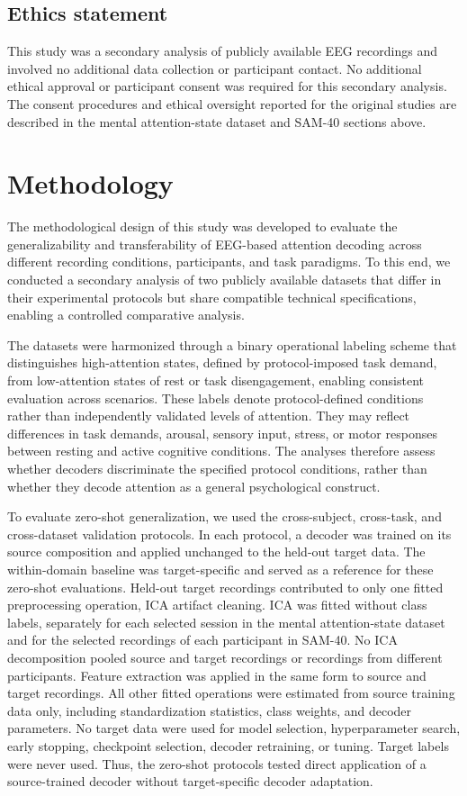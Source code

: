\documentclass[10pt,letterpaper]{article}
\newcommand{\rev}[1]{#1}
\begin{document}
\subsection*{Ethics statement}

This study was a secondary analysis of publicly available EEG recordings and involved no additional data collection or participant contact. No additional ethical approval or participant consent was required for this secondary analysis. The consent procedures and ethical oversight reported for the original studies are described in the mental attention-state dataset and SAM-40 sections above.

\section*{Methodology}

The methodological design of this study was developed to evaluate the generalizability and transferability of EEG-based attention decoding across different recording conditions, participants, and task paradigms. To this end, we conducted a secondary analysis of two publicly available datasets that differ in their experimental protocols but share compatible technical specifications, enabling a controlled comparative analysis.

\rev{The datasets were harmonized through a binary operational labeling scheme that
distinguishes high-attention states, defined by protocol-imposed task demand,
from low-attention states of rest or task disengagement, enabling consistent
evaluation across scenarios. These labels denote protocol-defined conditions
rather than independently validated levels of attention. They may reflect
differences in task demands, arousal, sensory input, stress, or motor responses
between resting and active cognitive conditions. The analyses therefore assess
whether decoders discriminate the specified protocol conditions, rather than
whether they decode attention as a general psychological construct.}

\rev{To evaluate zero-shot generalization, we used the cross-subject,
cross-task, and cross-dataset validation protocols. In each protocol, a
decoder was trained on its source composition and applied unchanged to the
held-out target data. The within-domain baseline was target-specific and
served as a reference for these zero-shot evaluations. Held-out target
recordings contributed to only one fitted preprocessing operation, ICA artifact
cleaning. ICA was fitted without class labels, separately for each selected
session in the mental attention-state dataset and for the selected recordings
of each participant in SAM-40. No ICA decomposition pooled source and target
recordings or recordings from different participants. Feature extraction was
applied in the same form to source and target recordings. All other fitted
operations were estimated from source training data only, including
standardization statistics, class weights, and decoder parameters. No target
data were used for model selection, hyperparameter search, early stopping,
checkpoint selection, decoder retraining, or tuning. Target labels were never
used. Thus, the zero-shot protocols tested direct application of a
source-trained decoder without target-specific decoder adaptation.}
\end{document}

